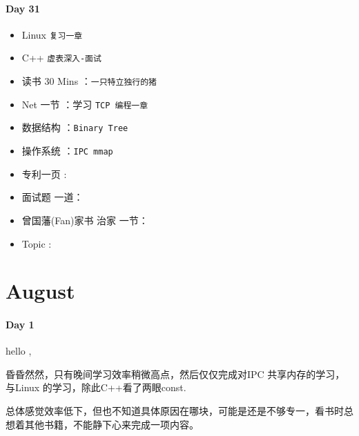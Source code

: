 \documentclass[UTF8,a4paper,8pt]{ctexart}
\begin{document}
 	 \paragraph{Day 31      \quad     }
	 	 \begin{itemize}[itemindent = 1em]
	 	 	\renewcommand\labelitemi{\makebox[0pt][l]{$\square$}\hspace{1em}} 
	 	 	\renewcommand\labelitemi{\makebox[0pt][l]{$\square$}\raisebox{.15ex}{\hspace{0.1em}$\checkmark$}}	 	
	 	 	\item   Linux \verb|复习一章|
	 	 	\item   C++   \verb|虚表深入-面试|
	 	 	
	 	 	\item   读书  30 Mins	：\verb|一只特立独行的猪|
	 	 	\item   Net 一节 ：学习 \verb|TCP 编程一章|	
	 	 	
	 	 	\renewcommand\labelitemi{\makebox[0pt][l]{$\square$}\hspace{1em}} 
	 	 	\item   数据结构 ：\verb|Binary Tree| 
	 	 	\item   操作系统 ：\verb|IPC mmap|
	 	 	\item   专利一页 :	
	 	 	\item   面试题 一道：
	 	 	
	 	 	\renewcommand\labelitemi{\makebox[0pt][l]{$\square$}\raisebox{.15ex}{\hspace{0.1em}$\checkmark$}}
	 	 	\item   曾国藩(Fan)家书 治家 一节：
	 	 	\item   Topic :
	 	 \end{itemize}
 \section{August}
 	 \paragraph{Day 1       \quad     }
	 	 hello ,
	 	 
	 	 昏昏然然，只有晚间学习效率稍微高点，然后仅仅完成对IPC 共享内存的学习，与Linux 的学习，除此C++看了两眼const.
	 	 
	 	 总体感觉效率低下，但也不知道具体原因在哪块，可能是还是不够专一，看书时总想着其他书籍，不能静下心来完成一项内容。
	 	 
\end{document}
